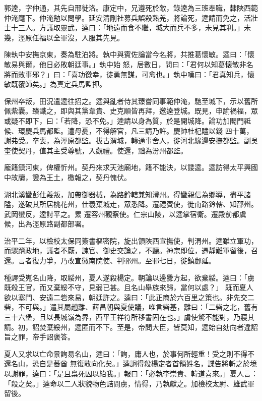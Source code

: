 \begin{pinyinscope}
 郭逵，字仲通，其先自邢徙洛。康定中，兄遵死於敵，錄逵為三班奉職，隸陜西範仲淹麾下。仲淹勉以問學。延安清剛社募兵誤殺熟羌，將論死，逵請而免之，活壯士十三人。方議取靈武，逵曰：「地遠而食不繼，城大而兵不多，未見其利。」未幾，涇原任福以全軍沒，人服其先見。



 陳執中安撫京東，奏為駐泊將。執中與賓佐論當今名將，共推葛懷敏。逵曰：「懷敏易與爾，他日必敗朝廷事。」執中始
 怒，居數日，問曰：「君何以知葛懷敏非名將而敗事邪？」曰：「喜功徼幸，徒勇無謀，可禽也。」執中嘆曰：「君真知兵，懷敏既覆師矣。」為真定兵馬監押。



 保州卒叛，田況遣逵往招之。逵與亂者侍其臻嘗同事範仲淹，馳至城下，示以舊所佩紫囊。臻識之，即與其黨韋貴、史克順皆再拜，邀逵登城。既見，申諭禍福，眾或疑不即下，曰：「若降，恐不免。」逵請以身為質，於是開城降。論功加閣門祗候、環慶兵馬都監。遭母憂，不得解官，凡三請乃許。慶帥杜杞贐以錢
 四十萬，謝弗受。卒喪，為涇原都監。拔古渭城，轉通事舍人，徙河北緣邊安撫都監。副吳奎使契丹，值其主受尊號，入觀禮。使還，黜為汾州都監。



 龐籍鎮河東，俾權忻州。契丹來求天池廟地，籍不能決，以諉逵。逵訪得太平興國中故牘，證為王土，檄報之，契丹愧伏。



 湖北溪蠻彭仕羲叛，加帶御器械，為路鈐轄兼知澧州。得蠻親信為鄉導，盡平諸隘，遂破其所居桃花州，仕羲棄城走，眾悉降。遷禮賓使，徙南路鈐轄、知邵州。武岡蠻反，逵討平之。累
 遷容州觀察使。仁宗山陵，以逵掌宿衛。遷殿前都虞候，出為涇原路副都部署。



 治平二年，以檢校太保同簽書樞密院，旋出領陜西宣撫使，判渭州。逵雖立軍功，而驟躋政地，議者不厭，諫官、御史交論之，不聽。神宗即位，遷靜難軍留後，召還。言者復力爭，乃改宣徽南院使、判鄆州。至鄆七日，徙鎮鄜延。



 種諤受嵬名山降，取綏州，夏人遂殺楊定。朝論以邊釁方起，欲棄綏。逵曰：「虜既殺王官，而又棄綏不守，見弱已甚。且名山舉族來歸，當何以處？」
 既而夏人欲以塞門、安遠二砦來易，朝廷許之。逵曰：「此正商於六百里之策也。非先交二砦，不可與。」遣其屬趙離、薛昌朝與夏使議，唯言砦基，離曰：「二砦之北，舊有三十六堡，且以長城嶺為界，西平王祥符所移書固在也。」虜使驚不能對，乃寢其請。初，詔焚棄綏州，逵匿而不下。至是，帝問大臣，皆莫知，逵始自劾向者違詔旨之罪，帝手詔褒答。



 夏人又求以亡命景詢易名山，逵曰：「詢，庸人也，於事何所輕重！受之則不得不還名山，恐自是蕃酋
 無復敢向化矣。」逵詗得殺楊定者首領姓名，諜告將斬之於境以謝罪，逵曰：「是且梟死囚以紿我。」報曰：「必執李崇貴、韓道喜來。」夏人言：「殺之矣。」逵命以二人狀貌物色詰問虜，情得，乃執獻之。加檢校太尉、雄武軍留後。




\end{pinyinscope}
